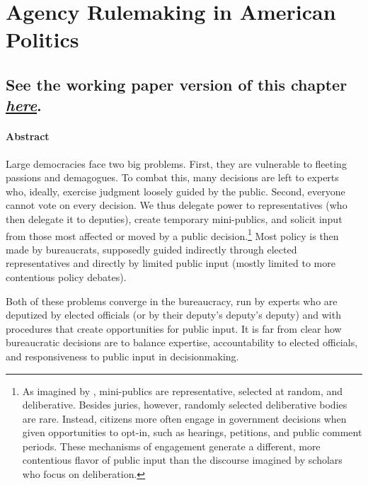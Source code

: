 \documentclass[
]{book}
\begin{document}
\hypertarget{agency-rulemaking-in-american-politics}{%
\chapter{Agency Rulemaking in American Politics}\label{agency-rulemaking-in-american-politics}}

\hypertarget{see-the-working-paper-version-of-this-chapter-here.}{%
\section{\texorpdfstring{See the working paper version of this chapter \href{https://judgelord.github.io/dissertation/MacroRulemaking.pdf}{\emph{here}}.}{See the working paper version of this chapter here.}}\label{see-the-working-paper-version-of-this-chapter-here.}}

\hypertarget{abstract}{%
\subsubsection*{Abstract}\label{abstract}}

Large democracies face two big problems. First, they are vulnerable to fleeting passions and demagogues. To combat this, many decisions are left to experts who, ideally, exercise judgment loosely guided by the public. Second, everyone cannot vote on every decision. We thus delegate power to representatives (who then delegate it to deputies), create temporary mini-publics, and solicit input from those most affected or moved by a public decision.\footnote{As imagined by \citet{Dahl1989}, mini-publics are representative, selected at random, and deliberative. Besides juries, however, randomly selected deliberative bodies are rare. Instead, citizens more often engage in government decisions when given opportunities to opt-in, such as hearings, petitions, and public comment periods. These mechanisms of engagement generate a different, more contentious flavor of public input than the discourse imagined by scholars who focus on deliberation.} Most policy is then made by bureaucrats, supposedly guided indirectly through elected representatives and directly by limited public input (mostly limited to more contentious policy debates).

Both of these problems converge in the bureaucracy, run by experts who are deputized by elected officials (or by their deputy's deputy's deputy) and with procedures that create opportunities for public input. It is far from clear how bureaucratic decisions are to balance expertise, accountability to elected officials, and responsiveness to public input in decisionmaking.
\end{document}
